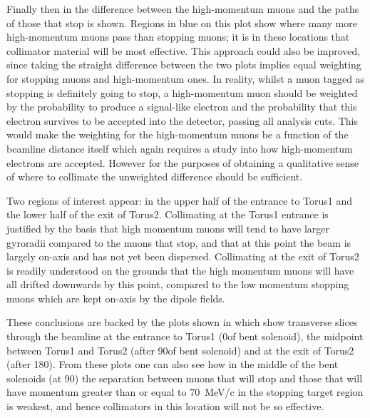 Finally then in  the difference between the high-momentum muons and the paths of those that stop is shown. 
Regions in blue on this plot show where many more high-momentum muons pass than stopping muons; it is in these locations that collimator material will be most effective.
This approach could also be improved, since taking the straight difference between the two plots implies equal weighting for stopping muons and high-momentum ones.
In reality, whilst a muon tagged as stopping is definitely going to stop, a high-momentum muon should be weighted by the probability to produce a signal-like electron and the probability that this electron survives to be accepted into the detector, passing all analysis cuts.
This would make the weighting for the high-momentum muons be a function of the beamline distance itself which again requires a study into how high-momentum electrons are accepted.
However for the purposes of obtaining a qualitative sense of where to collimate the unweighted difference should be sufficient.

Two regions of interest appear: in the upper half of the entrance to Torus1 and the lower half of the exit of Torus2.  
Collimating at the Torus1 entrance is justified by the basis that high momentum muons will tend to have larger gyroradii compared to the muons that stop, and that at this point the beam is largely on-axis and has not yet been dispersed.
Collimating at the exit of Torus2 is readily understood on the grounds that the high momentum muons will have all drifted downwards by this point, compared to the low momentum stopping muons which are kept on-axis by the dipole fields.

\FigOptimMuBeamCollimTransverseSep
These conclusions are backed by the plots shown in  which show transverse slices through the beamline at the entrance to Torus1 (0\degree of bent solenoid), the midpoint between Torus1 and Torus2 (after 90\degree of bent solenoid) and at the exit of Torus2 (after 180\degree).
From these plots one can also see how in the middle of the bent solenoids (at 90\degree) the separation between muons that will stop and those that will have momentum greater than or equal to 70~MeV/c in the stopping target region is weakest, and hence collimators in this location will not be so effective.

